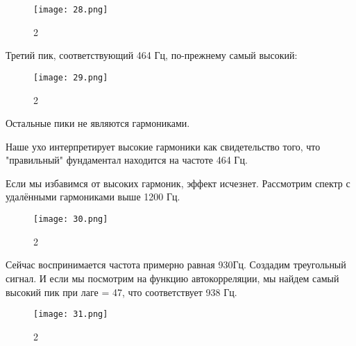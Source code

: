 \documentclass[10pt,a4paper,oneside]{article}
\begin{document}
\begin{figure}[H]
        \centering
        \texttt{[image: 28.png]}
        \caption{2}
        \label{fig:first}
\end{figure}

Третий пик, соответствующий 464 Гц, по-прежнему самый высокий:

\begin{figure}[H]
        \centering
        \texttt{[image: 29.png]}
        \caption{2}
        \label{fig:first}
\end{figure}

Остальные пики не являются гармониками.

Наше ухо интерпретирует высокие гармоники как свидетельство того, что "правильный" фундаментал находится на частоте 464 Гц.

Если мы избавимся от высоких гармоник, эффект исчезнет. Рассмотрим спектр с удалёнными гармониками выше 1200 Гц.

\begin{figure}[H]
        \centering
        \texttt{[image: 30.png]}
        \caption{2}
        \label{fig:first}
\end{figure}

Сейчас воспринимается частота примерно равная 930Гц. Создадим треугольный сигнал. И если мы посмотрим на функцию автокорреляции, мы найдем самый высокий пик при лаге = 47, что соответствует 938 Гц.

\begin{figure}[H]
        \centering
        \texttt{[image: 31.png]}
        \caption{2}
        \label{fig:first}
\end{figure}
\end{document}
